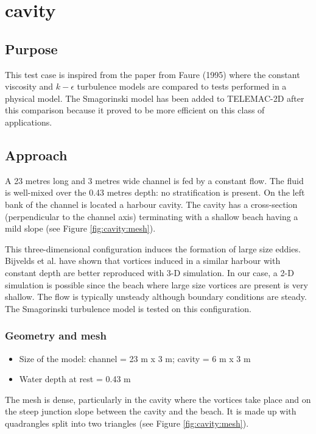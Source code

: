 \chapter{cavity}

\section{Purpose}
This test case is inspired from the paper from Faure (1995)
\cite{Faure1995}where the constant viscosity and $k-\epsilon$ turbulence models
are compared to tests performed in a physical model. The Smagorinski model has
been added to TELEMAC-2D after this comparison because it proved to be more
efficient on this class of applications.

\section{Approach}
A 23 metres long and 3 metres wide channel is fed by a constant flow. The fluid
is well-mixed over the 0.43 metres depth: no stratification is present. On the
left bank of the channel is located a harbour cavity. The cavity has a
cross-section (perpendicular to the channel axis) terminating with a shallow
beach having a mild slope (see Figure \ref{fig:cavity:mesh}).

This three-dimensional configuration induces the formation of large size
eddies. Bijvelds et al. \cite{Bijvelds1997} have shown that vortices induced in
a similar harbour with constant depth are better reproduced with 3-D
simulation. In our case, a 2-D simulation is possible since the beach where
large size vortices are present is very shallow. The flow is typically unsteady
although boundary conditions are steady. The Smagorinski turbulence model is
tested on this configuration.

\subsection{Geometry and mesh}

\begin{itemize}
\item Size of the model: channel = 23 m x 3 m; cavity = 6 m x 3 m
\item Water depth at rest = 0.43 m
\end{itemize}

The mesh is dense, particularly in the cavity where the vortices take place and
on the steep junction slope between the cavity and the beach. It is made up
with quadrangles split into two triangles (see Figure \ref{fig:cavity:mesh}).

